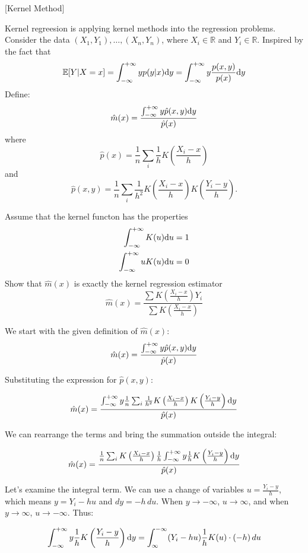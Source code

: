 \item {} [Kernel Method]

Kernel regreesion is applying kernel methods into the regression problems. Consider the data $\left(X_{1}, Y_{1}\right), \ldots,\left(X_{n}, Y_{n}\right)$, where $X_{i} \in \mathbb{R}$ and $Y_{i} \in \mathbb{R}$. Inspired by the fact that
$$\mathbb{E}[Y | X=x]=\int_{-\infty}^{+\infty} y p(y|x) \mathrm{d}y=\int_{-\infty}^{+\infty} y \dfrac{p(x, y)}{p(x)} \mathrm{d}y$$
Define:
$$\hat{m}(x)=\dfrac{\int_{-\infty}^{+\infty} y \hat{p}(x, y) \mathrm{d}y}{\hat{p}(x)}$$
where
$$\hat{p}(x)=\dfrac{1}{n} \sum_{i} \dfrac{1}{h} K\left(\frac{X_{i}-x}{h}\right)$$
and
$$\hat{p}(x, y)= \frac{1}{n} \sum_{i} \frac{1}{h^{2}} K\left(\frac{X_{i}-x}{h}\right) K\left(\frac{Y_{i}-y}{h}\right) .$$

Assume that the kernel functon has the properties
\begin{align*}
\int_{-\infty}^{+\infty} K(u) \mathrm{d}u &= 1 \\
\int_{-\infty}^{+\infty} uK(u) \mathrm{d}u &= 0
\end{align*}
Show that $\hat{m}(x)$ is exactly the kernel regression estimator
$$\hat{m}(x) = \dfrac{\sum K\left(\frac{X_{i}-x}{h}\right) Y_{i}}{\sum K\left(\frac{X_{i}-x}{h}\right)}$$

\solution

We start with the given definition of $\hat{m}(x)$:
$$\hat{m}(x)=\dfrac{\int_{-\infty}^{+\infty} y \hat{p}(x, y) \mathrm{d}y}{\hat{p}(x)}$$

Substituting the expression for $\hat{p}(x, y)$:

$$\hat{m}(x)=\dfrac{\int_{-\infty}^{+\infty} y \frac{1}{n} \sum_{i} \frac{1}{h^{2}} K\left(\frac{X_{i}-x}{h}\right) K\left(\frac{Y_{i}-y}{h}\right) \mathrm{d}y}{\hat{p}(x)}$$

We can rearrange the terms and bring the summation outside the integral:

$$\hat{m}(x)=\dfrac{\frac{1}{n} \sum_{i} K\left(\frac{X_{i}-x}{h}\right) \frac{1}{h} \int_{-\infty}^{+\infty} y \frac{1}{h} K\left(\frac{Y_{i}-y}{h}\right) \mathrm{d}y}{\hat{p}(x)}$$

Let's examine the integral term. We can use a change of variables $u = \frac{Y_i-y}{h}$, which means $y = Y_i - hu$ and $dy = -h \, du$. When $y \rightarrow -\infty$, $u \rightarrow \infty$, and when $y \rightarrow \infty$, $u \rightarrow -\infty$. Thus:

$$\int_{-\infty}^{+\infty} y \frac{1}{h} K\left(\frac{Y_{i}-y}{h}\right) \mathrm{d}y = \int_{\infty}^{-\infty} (Y_i - hu) \frac{1}{h} K(u) \cdot (-h) \, du$$

